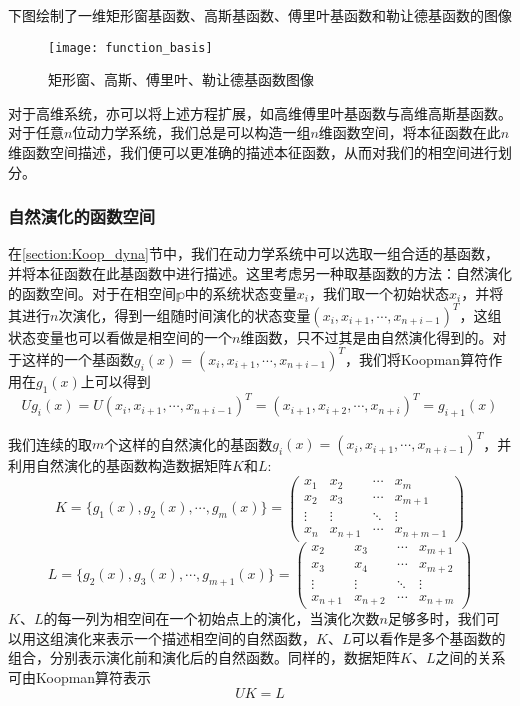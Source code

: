 下图绘制了一维矩形窗基函数、高斯基函数、傅里叶基函数和勒让德基函数的图像
\begin{figure}
	\centering
	\texttt{[image: function\_basis]}
    \caption{矩形窗、高斯、傅里叶、勒让德基函数图像}
    \label{fig:func_bas}
\end{figure}

对于高维系统，亦可以将上述方程扩展，如高维傅里叶基函数与高维高斯基函数。对于任意$n$位动力学系统，我们总是可以构造一组$n$维函数空间，将本征函数在此$n$维函数空间描述，我们便可以更准确的描述本征函数，从而对我们的相空间进行划分。

\subsubsection{自然演化的函数空间}

在\ref{section:Koop_dyna}节中，我们在动力学系统中可以选取一组合适的基函数，并将本征函数在此基函数中进行描述。这里考虑另一种取基函数的方法：自然演化的函数空间。对于在相空间$\mathbb{p}$中的系统状态变量$x_i$，我们取一个初始状态$x_i$，并将其进行$n$次演化，得到一组随时间演化的状态变量$(x_i,x_{i+1},\cdots,x_{n+i-1})^T$，这组状态变量也可以看做是相空间的一个$n$维函数，只不过其是由自然演化得到的。对于这样的一个基函数$g_i(x)=(x_i,x_{i+1},\cdots,x_{n+i-1})^T$，我们将Koopman算符作用在$g_1(x)$上可以得到
\begin{equation}
    Ug_i(x)=U(x_i,x_{i+1},\cdots,x_{n+i-1})^T=(x_{i+1},x_{i+2},\cdots,x_{n+i})^T=g_{i+1}(x)
\end{equation}

我们连续的取$m$个这样的自然演化的基函数$g_i(x)=(x_i,x_{i+1},\cdots,x_{n+i-1})^T$，并利用自然演化的基函数构造数据矩阵$K$和$L$:
\begin{equation}
    K=\{g_1(x),g_2(x),\cdots,g_m(x)\}=
    \begin{pmatrix}
        x_1 & x_2 & \cdots & x_m \\
        x_2 & x_3 & \cdots & x_{m+1} \\
        \vdots         & \vdots         & \ddots & \vdots \\
        x_n & x_{n+1} & \cdots & x_{n+m-1}
    \end{pmatrix}
\end{equation}
\begin{equation}
    L=\{g_2(x),g_3(x),\cdots,g_{m+1}(x)\}=
    \begin{pmatrix}
        x_2 & x_3 & \cdots & x_{m+1} \\
        x_3 & x_4 & \cdots & x_{m+2} \\
        \vdots         & \vdots         & \ddots & \vdots \\
        x_{n+1} & x_{n+2} & \cdots & x_{n+m}
    \end{pmatrix}
\end{equation}
$K$、$L$的每一列为相空间在一个初始点上的演化，当演化次数$n$足够多时，我们可以用这组演化来表示一个描述相空间的自然函数，$K$、$L$可以看作是多个基函数的组合，分别表示演化前和演化后的自然函数。同样的，数据矩阵$K$、$L$之间的关系可由Koopman算符表示
\begin{equation}
    UK=L
\end{equation}

